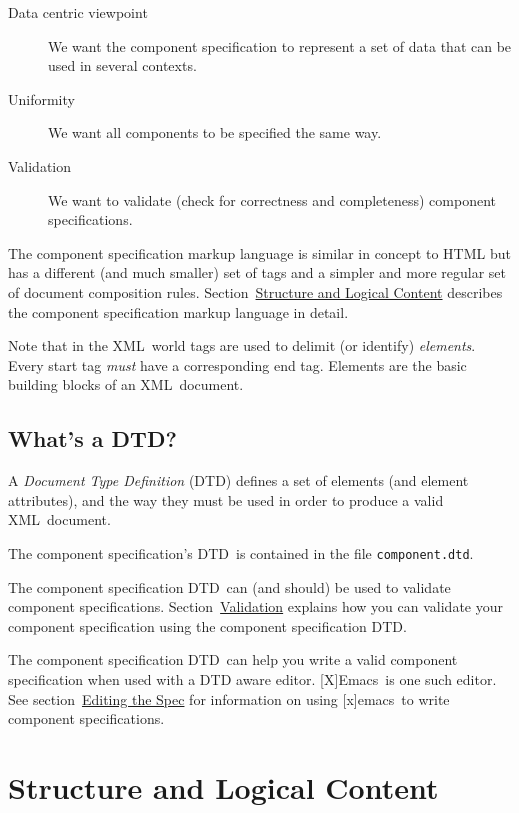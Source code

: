 \documentclass{article}
\newcommand{\acronym}[1]{#1}
\newcommand{\dfn}[1]{\emph{#1}}
\newcommand{\filename}[1]{\texttt{#1}}
\newcommand{\xml}{\acronym{XML}}
\newcommand{\dtd}{\acronym{DTD}}
\newcommand{\emacs}{[x]emacs}
\newcommand{\Emacs}{[X]Emacs}
\newcommand{\sectitleref}[1]{\emph{#1}}
\newcommand{\SUBSECwhatDtd}{What's a \dtd?}
\newcommand{\SECcontent}{Structure and Logical Content}
\newcommand{\SECediting}{Editing the Spec}
\newcommand{\SUBSECvalidation}{Validation}
\begin{document}
\begin{description}
\item[Data centric viewpoint] We want the component specification to represent
  a set of data that can be used in several contexts.

\item[Uniformity] We want all components to be specified the same way.

\item[Validation] We want to validate (check for correctness and
  completeness) component specifications.
\end{description}

The component specification markup language is similar in concept to HTML but
has a different (and much smaller) set of tags and a simpler and more
regular set of document composition rules.
Section~\hyperref{\sectitleref{\SECcontent}}{}{}{\SECcontent} describes
the component specification markup language in detail.

Note that in the \xml\ world tags are used to delimit (or identify)
\dfn{elements}.  Every start tag \emph{must} have a corresponding end tag.
Elements are the basic building blocks of an \xml\ document.

\subsection{\SUBSECwhatDtd}
\label{\SUBSECwhatDtd}

A \dfn{Document Type Definition} (\dtd) defines a set of elements (and
element attributes), and the way they must be used in order to produce a
valid \xml\ document.

The component specification's \dtd\ is contained in the file
\filename{component.dtd}. 

The component specification \dtd\ can (and should) be used to validate
component specifications.
Section~\hyperref{\sectitleref{\SUBSECvalidation}}{}{}{\SUBSECvalidation}
explains how you can validate your component specification using the
component specification \dtd.

The component specification \dtd\ can help you write a valid component
specification when used with a \acronym{DTD} aware editor.  \Emacs\ is one
such editor.  See
section~\hyperref{\sectitleref{\SECediting}}{}{}{\SECediting} for information
on using \emacs\ to write component specifications.

\section{\SECcontent}
\label{\SECcontent}
\end{document}
